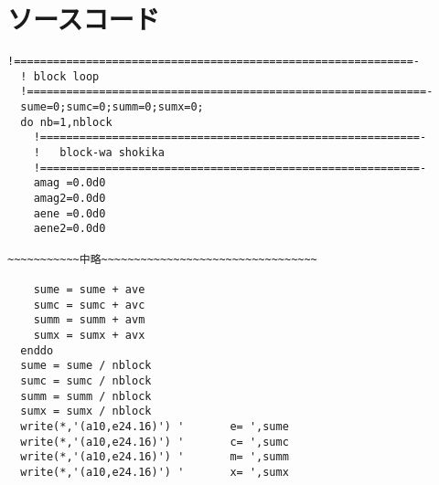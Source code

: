 \appendix
\def\thesection{補遺\Alph{section}}
\renewcommand*{\thelstlisting}{\Alph{section}.\arabic{lstlisting}}
\section{ソースコード}
\begin{lstlisting}[caption=5-Aのソースコード,label=src5a]
  !=============================================================-
  ! block loop
  !=============================================================-
  sume=0;sumc=0;summ=0;sumx=0;
  do nb=1,nblock
    !==========================================================-
    !   block-wa shokika
    !==========================================================-
    amag =0.0d0
    amag2=0.0d0
    aene =0.0d0
    aene2=0.0d0

~~~~~~~~~~~中略~~~~~~~~~~~~~~~~~~~~~~~~~~~~~~~~~

    sume = sume + ave
    sumc = sumc + avc
    summ = summ + avm
    sumx = sumx + avx
  enddo
  sume = sume / nblock
  sumc = sumc / nblock
  summ = summ / nblock
  sumx = sumx / nblock
  write(*,'(a10,e24.16)') '       e= ',sume
  write(*,'(a10,e24.16)') '       c= ',sumc
  write(*,'(a10,e24.16)') '       m= ',summ
  write(*,'(a10,e24.16)') '       x= ',sumx
\end{lstlisting}